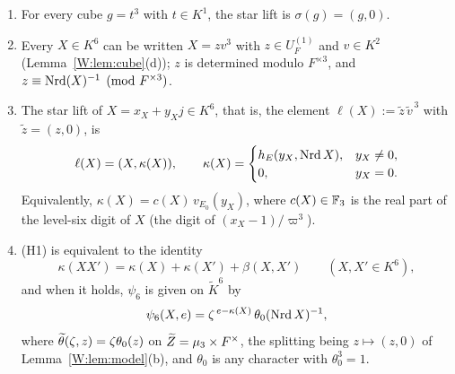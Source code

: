 \begin{corollary}\label{W:cor:starK6}
\begin{enumerate}[label=(\alph*)]
\item For every cube $g=t^3$ with $t\in K^1$, the star lift is
$\sigma(g)=(g,0)$.
\item Every $X\in K^6$ can be written $X=zv^3$ with $z\in U_F^{(1)}$ and
$v\in K^2$ (Lemma~\ref{W:lem:cube}(d)); $z$ is determined modulo $F^{\times3}$,
and $z\equiv\operatorname{Nrd}(X)^{-1}\pmod{F^{\times3}}$.
\item The star lift of $X=x_X+y_Xj\in K^6$, that is, the element
$\ell(X):=\tilde z\,\tilde v^{\,3}$ with $\tilde z=(z,0)$, is
\begin{equation}\label{W:eq:ell}
 \ell(X)=(X,\kappa(X)),\qquad
 \kappa(X)=\begin{cases}h_E(y_X,\operatorname{Nrd} X),& y_X\ne0,\\ 0,& y_X=0.\end{cases}
\end{equation}
Equivalently, $\kappa(X)=c(X)\,v_{E_0}(y_X)$, where $c(X)\in\mathbb F_3$ is the
real part of the level-six digit of $X$ (the digit of $(x_X-1)/\varpi^3$).
\item (H1) is equivalent to the identity
\begin{equation}\label{W:eq:H1identity}
 \kappa(XX')=\kappa(X)+\kappa(X')+\beta(X,X')\qquad(X,X'\in K^6),
\end{equation}
and when it holds, $\psi_6$ is given on $\tilde K^6$ by
\begin{equation}\label{W:eq:psi6formula}
 \psi_6(X,e)=\zeta^{\,e-\kappa(X)}\,\theta_0(\operatorname{Nrd} X)^{-1},
\end{equation}
where $\widetilde\theta(\zeta,z)=\zeta\theta_0(z)$ on $\widetilde Z=\mu_3\times F^\times$,
the splitting being $z\mapsto(z,0)$ of Lemma~\ref{W:lem:model}(b), and
$\theta_0$ is any character with $\theta_0^3=1$.
\end{enumerate}
\end{corollary}

